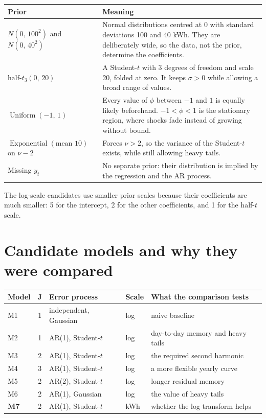 \documentclass[11pt]{article}
\makeatletter
\DeclareMathOperator{\Unif}{Uniform}
\DeclareMathOperator{\Expo}{Exponential}
\newenvironment{reftable}[3]
  {\par\nopagebreak\addvspace{4pt}\noindent
   \renewcommand{\arraystretch}{1.3}%
   \begin{tabular}{@{}>{\raggedright\arraybackslash}p{#1\textwidth}
                      >{\raggedright\arraybackslash}p{\dimexpr0.97\textwidth-#1\textwidth-2\tabcolsep\relax}@{}}
   \toprule \textbf{#2} & \textbf{#3} \\ \midrule}
  {\bottomrule\end{tabular}\par\addvspace{8pt}}
\makeatother
\begin{document}
\begin{reftable}{0.3}{Prior}{Meaning}
$N(0,\, 100^2)$ and $N(0,\, 40^2)$ & Normal distributions centred at 0 with standard deviations 100 and 40 kWh. They are deliberately wide, so the data, not the prior, determine the coefficients. \\
$\text{half-}t_3(0,\, 20)$ & A Student-$t$ with 3 degrees of freedom and scale 20, folded at zero. It keeps $\sigma > 0$ while allowing a broad range of values. \\
$\Unif(-1,\, 1)$ & Every value of $\phi$ between $-1$ and $1$ is equally likely beforehand. $-1 < \phi < 1$ is the stationary region, where shocks fade instead of growing without bound. \\
$\Expo(\text{mean } 10)$ on $\nu - 2$ & Forces $\nu > 2$, so the variance of the Student-$t$ exists, while still allowing heavy tails. \\
Missing $y_t$ & No separate prior: their distribution is implied by the regression and the AR process. \\
\end{reftable}

The log-scale candidates use smaller prior scales because their coefficients
are much smaller: 5 for the intercept, 2 for the other coefficients, and 1 for
the half-$t$ scale.

\section{Candidate models and why they were compared}

\begin{center}
\small
\renewcommand{\arraystretch}{1.2}
\begin{tabular}{@{}lclll@{}}
\toprule
\textbf{Model} & $\boldsymbol{J}$ & \textbf{Error process} & \textbf{Scale} & \textbf{What the comparison tests} \\
\midrule
M1 & 1 & independent, Gaussian & log & naive baseline \\
M2 & 1 & AR(1), Student-$t$ & log & day-to-day memory and heavy tails \\
M3 & 2 & AR(1), Student-$t$ & log & the required second harmonic \\
M4 & 3 & AR(1), Student-$t$ & log & a more flexible yearly curve \\
M5 & 2 & AR(2), Student-$t$ & log & longer residual memory \\
M6 & 2 & AR(1), Gaussian & log & the value of heavy tails \\
\textbf{M7} & 2 & AR(1), Student-$t$ & kWh & whether the log transform helps \\
\bottomrule
\end{tabular}
\end{center}
\end{document}
